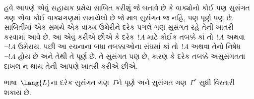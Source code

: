 \begin{explain}
હવે આપણે એવું સહાયક પ્રમેય સાબિત કરીશું જે બતાવે છે કે
વાક્યોનો કોઈ પણ સુસંગત ગણ એવા કોઈ વાક્યગણમાં સમાયેલો છે જે
માત્ર સુસંગત જ નહિ, પણ પૂર્ણ પણ છે. સાબિતીમાં એક સમયે એક
વાક્ય ઉમેરીને દરેક પગલે ગણ સુસંગત રહે તેની ખાતરી કરવામાં આવે
છે. આ એવું કરીએ છીએ કે દરેક~$!A$ માટે કોઈક તબક્કે કાં તો~$!A$ અથવા
$\lnot !A$ ઉમેરાય. પછી આ રચનાના બધા તબક્કાઓના સંઘમાં કાં તો~$!A$ અથવા
તેનો નિષેધ~$\lnot !A$ હોય છે અને તેથી તે પૂર્ણ છે. તે સુસંગત પણ છે,
કારણ કે દરેક તબક્કે અસુસંગતતા દાખલ ન થાય તેની આપણે ખાતરી કરીએ છીએ.
\end{explain}

\begin{lem}
 ભાષા~$\Lang{L}$ના દરેક સુસંગત ગણ~$\Gamma$ને
પૂર્ણ અને સુસંગત ગણ~$\Gamma^*$ સુધી વિસ્તારી શકાય છે.
\end{lem}

